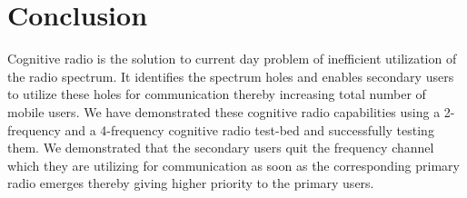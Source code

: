 \chapter{Conclusion}

Cognitive radio is the solution to current day problem of inefficient 
utilization of the radio spectrum. It identifies the spectrum holes and 
enables secondary users to utilize these holes for communication thereby 
increasing total number of mobile users. We have demonstrated these cognitive
radio capabilities using a 2-frequency and a 4-frequency cognitive radio
test-bed and successfully testing them.  We demonstrated that the secondary 
users quit the frequency channel which they are utilizing for communication
as soon as the corresponding primary radio emerges thereby giving higher
priority to the primary users.